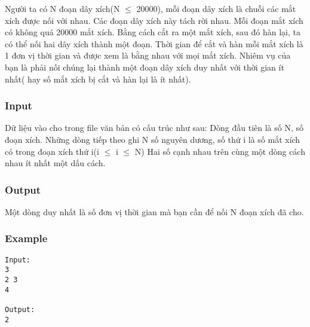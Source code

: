 



   Người ta có N đoạn dây xích(N  $\le$  20000), mỗi đoạn dây xích là  chuỗi các mắt xích được nối với nhau. Các đoạn dây xích này tách rời nhau. Mỗi đoạn mắt xích có không quá 20000 mắt xích.  Bằng cách cắt ra một mắt xích, sau đó hàn lại, ta có thể nối hai dây xích thành một đoạn. Thời gian để cắt và hàn mỗi mắt xích là 1 đơn vị thời gian và được xem là bằng nhau với mọi mắt xích.  Nhiêm vụ của bạn là phải nối chúng lại thành một đoạn dây xích duy nhất với thời gian ít nhất( hay số mắt xích bị cắt và hàn lại là ít nhất).  

\subsubsection{   Input  }

   Dữ liệu vào cho trong file văn bản có cấu trúc như sau:  Dòng đầu tiên là số N, số đoạn xích.  Những dòng tiếp theo ghi N số nguyên dương, số thứ i là số mắt xích có trong đoạn xích thứ i(i  $\le$  i  $\le$  N)  Hai số cạnh nhau trên cùng một dòng cách nhau ít nhất một dấu cách.  

\subsubsection{   Output  }

   Một dòng duy nhất là số đơn vị thời gian mà bạn cần để nối N đoạn xích đã cho.  

\subsubsection{   Example  }
\begin{verbatim}
Input:
3
2 3
4

Output:
2
\end{verbatim}
